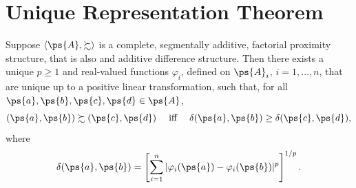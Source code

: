 \section{Unique Representation Theorem}
\begin{thm}\label{thm-uniquene-repr-minkowski} 
	Suppose $\langle \ps{A}, \succsim \rangle$ is a complete, segmentally additive, factorial proximity structure, that is also and additive difference structure.
	Then there exists a unique $p \geq 1$ and real-valued functions $\varphi_i$, defined on $\ps{A}_i$, $i = 1, \ldots, n$, that are unique up to a positive linear transformation, such that, for all $\ps{a}, \ps{b}, \ps{c}, \ps{d} \in \ps{A}$,
	$$(\ps{a}, \ps{b}) \succsim (\ps{c}, \ps{d}) \quad  \text{ iff } \quad  \delta(\ps{a}, \ps{b}) \geq \delta(\ps{c}, \ps{d}),$$
	where
	$$\delta(\ps{a}, \ps{b}) = \left[\sum_{i=1}^{n} |\varphi_i(\ps{a}) - \varphi_i(\ps{b})|^p\right]^{1/p}.$$
\end{thm}

\newcommand\ta{x}

